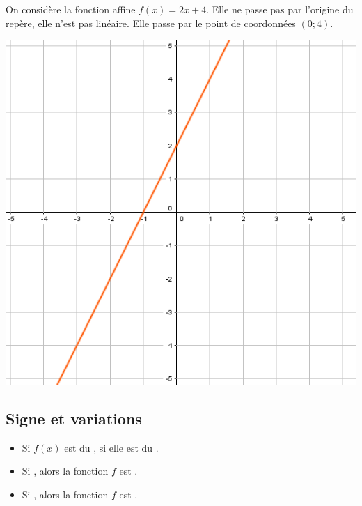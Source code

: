 \documentclass[12pt,a4paper]{article}
\begin{document}
	\begin{myex}
		\begin{multicols}{2}
			\vspace*{1.5cm}
			On considère la fonction affine $f(x)=2x+4$. Elle ne passe pas par l'origine du repère, elle n'est pas linéaire. Elle passe par le point de coordonnées $(0;4)$.
			
			\includegraphics[scale=0.5]{img/ex1}
		\end{multicols}
	\end{myex}

	\subsection{Signe et variations}
	
	\begin{myprops}
		\begin{itemize}
			\item Si  $f(x)$ est du , si   elle est du .
			\item Si , alors la fonction $f$ est .
			\item Si , alors la fonction $f$ est .
		\end{itemize}
	\end{myprops}
\end{document}
